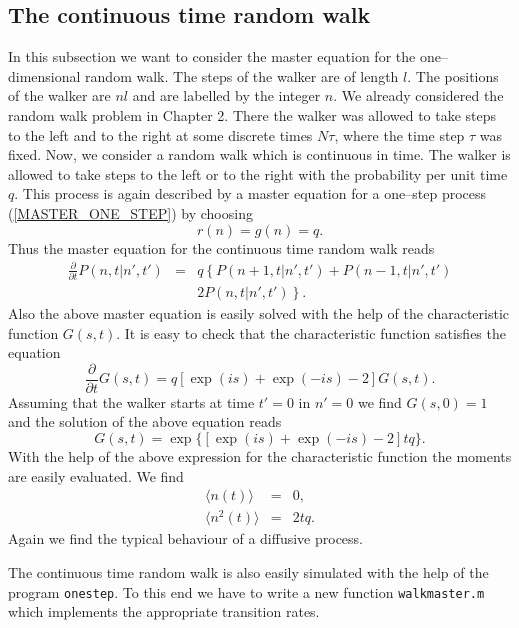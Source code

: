 \subsection{The continuous time random walk}
In this subsection we want to consider the master equation for
the one--dimensional random walk. The steps of the walker are of 
length $l$. The positions of the walker are $nl$ and are labelled
by the integer $n$. We already considered the random walk problem 
in Chapter 2.  There the walker was allowed to take steps 
to the left and to the right at some 
discrete times $N\tau$, where the time step $\tau$ was fixed.
Now, we consider a random walk which is continuous in time. The 
walker is allowed to take steps to the left or to the right with 
the probability per unit time $q$. This process is again described 
by a master equation for a one--step process (\ref{MASTER_ONE_STEP})
by choosing
\begin{equation*}
r(n) =g(n) =q.
\end{equation*}
Thus the master equation for the continuous time random walk
reads
\begin{eqnarray*}
\frac{\partial}{\partial t} P(n,t|n',t') &=& 
       q \left\{ P(n+1,t|n',t') + P(n-1,t|n',t')\right. \\
       && \left.   2 P(n,t|n',t')  \right\}.
\end{eqnarray*}
Also the above master equation is easily solved with the help of 
the characteristic function $G(s,t)$. It is easy to check that the
characteristic function satisfies the equation
\begin{equation*}
\frac{\partial}{\partial t} G(s,t) = q [\exp(is) +\exp(-is) -2] G(s,t).
\end{equation*}
Assuming that the walker starts at time $t'=0$ in $n'=0$ we find
$G(s,0)=1$ and the solution of the above equation reads
\begin{equation*}
G(s,t) = \exp\{[ \exp(is) +\exp(-is) -2  ]tq\}.
\end{equation*}
With the help of the above expression for the characteristic 
function the moments are easily evaluated. We find
\begin{eqnarray*}
\langle n(t) \rangle &=& 0, \\
\langle n^2(t) \rangle &=& 2tq.
\end{eqnarray*}
Again we find the typical behaviour of a diffusive process.

The continuous time random walk is also easily simulated with the
help of the program \texttt{onestep}. To this end we have to write
a new function \texttt{walkmaster.m} which implements the 
appropriate transition rates.

